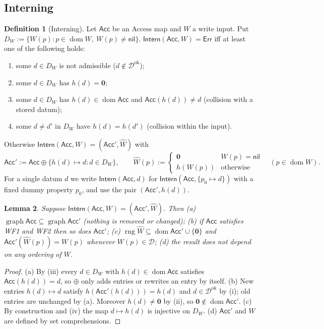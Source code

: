\documentclass[11pt,a4paper]{article}
\theoremstyle{definition}
\newtheorem{definition}{Definition}[section]
\theoremstyle{plain}
\newtheorem{lemma}[definition]{Lemma}
\theoremstyle{remark}
\newcommand{\Dat}{\mathcal{D}}
\newcommand{\nul}{\mathbf{0}}
\newcommand{\nil}{\mathsf{nil}}
\newcommand{\Err}{\mathsf{Err}}
\newcommand{\dom}{\operatorname{dom}}
\newcommand{\rng}{\operatorname{rng}}
\newcommand{\graph}{\operatorname{graph}}
\newcommand{\Acc}{\mathsf{Acc}}
\newcommand{\Intern}{\mathsf{Intern}}
\begin{document}
\subsection{Interning}

\begin{definition}[Interning]\label{def:intern}
Let $\Acc$ be an Access map and $W$ a write input. Put $D_W:=\{W(p) : p\in\dom W,\ W(p)\neq\nil\}$.
$\Intern(\Acc,W)=\Err$ iff at least one of the following holds:
\begin{enumerate}[label=(\roman*),leftmargin=*]
\item some $d\in D_W$ is not admissible ($d\notin\Dat^{\mathrm{ok}}$);
\item some $d\in D_W$ has $h(d)=\nul$;
\item some $d\in D_W$ has $h(d)\in\dom\Acc$ and $\Acc(h(d))\neq d$ (collision with a stored datum);
\item some $d\neq d'$ in $D_W$ have $h(d)=h(d')$ (collision within the input).
\end{enumerate}
Otherwise $\Intern(\Acc,W)=(\Acc',\widehat W)$ with
\[
\Acc':=\Acc\oplus\{h(d)\mapsto d : d\in D_W\},\qquad
\widehat W(p):=\begin{cases}\nul & W(p)=\nil\\ h(W(p)) & \text{otherwise}\end{cases}\quad(p\in\dom W).
\]
For a single datum $d$ we write $\Intern(\Acc,d)$ for $\Intern(\Acc,\{p_0\mapsto d\})$ with a fixed dummy property $p_0$, and use the pair $(\Acc',h(d))$.
\end{definition}

\begin{lemma}\label{lem:intern}
Suppose $\Intern(\Acc,W)=(\Acc',\widehat W)$. Then
(a) $\graph\Acc\subseteq\graph\Acc'$ (nothing is removed or changed);
(b) if $\Acc$ satisfies WF1 and WF2 then so does $\Acc'$;
(c) $\rng\widehat W\subseteq\dom\Acc'\cup\{\nul\}$ and $\Acc'(\widehat W(p))=W(p)$ whenever $W(p)\in\Dat$;
(d) the result does not depend on any ordering of $W$.
\end{lemma}
\begin{proof}
(a) By (iii) every $d\in D_W$ with $h(d)\in\dom\Acc$ satisfies $\Acc(h(d))=d$, so $\oplus$ only adds entries or rewrites an entry by itself.
(b) New entries $h(d)\mapsto d$ satisfy $h(\Acc'(h(d)))=h(d)$ and $d\in\Dat^{\mathrm{ok}}$ by (i); old entries are unchanged by (a).
Moreover $h(d)\neq\nul$ by (ii), so $\nul\notin\dom\Acc'$. (c) By construction and (iv) the map $d\mapsto h(d)$ is injective on $D_W$.
(d) $\Acc'$ and $\widehat W$ are defined by set comprehensions.
\end{proof}
\end{document}
